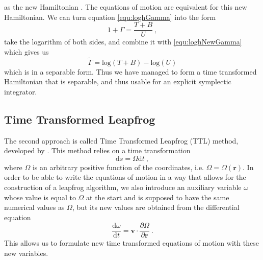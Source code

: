 \documentclass[english, oneside]{HYgradu}
\begin{document}
as the new Hamiltonian \citep{mikkola:1999}. The equations of motion are equivalent for this new Hamiltonian.
We can turn equation \ref{equ:loghGamma} into the form 
\begin{equation}
1 + \Gamma = \frac{T+B}{U} \ ,
\end{equation}
take the logarithm of both sides, and combine it with \ref{equ:loghNewGamma} which gives us 
\begin{equation}
\tilde{\Gamma} = \mathrm{log}(T+B) - \mathrm{log}(U)
\end{equation}
which is in a separable form. Thus we have managed to form a time transformed Hamiltonian that is separable, and thus usable for an explicit symplectic integrator. 

\subsection{Time Transformed Leapfrog}
The second approach is called Time Transformed Leapfrog (TTL) method, developed by \cite{mikkola:2002}. This method relies on a time transformation
\begin{equation}
\mathrm{d}s = \Omega \mathrm{d}t \ ,
\end{equation}
where $\Omega$ is an arbitrary positive function of the coordinates, i.e. $\Omega = \Omega(\boldsymbol{r})$. In order to be able to write the equations of motion in a way that allows for the construction of a leapfrog algorithm, we also introduce an auxiliary variable $\omega$ whose value is equal to $\Omega$ at the start and is supposed to have the same numerical values as $\Omega$, but its new values are obtained from the differential equation
\begin{equation}
\frac{\mathrm{d}\omega}{\mathrm{d}t} = \boldsymbol{v} \cdot \frac{\partial \Omega}{\partial \boldsymbol{r}} \ .
\end{equation}
This allows us to formulate new time transformed equations of motion with these new variables.
\end{document}
